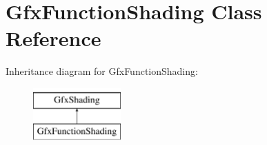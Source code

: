 \hypertarget{class_gfx_function_shading}{}\section{Gfx\+Function\+Shading Class Reference}
\label{class_gfx_function_shading}
Inheritance diagram for Gfx\+Function\+Shading\+:\begin{figure}[H]
\begin{center}
\leavevmode
\includegraphics[height=2.000000cm]{class_gfx_function_shading}
\end{center}
\end{figure}
